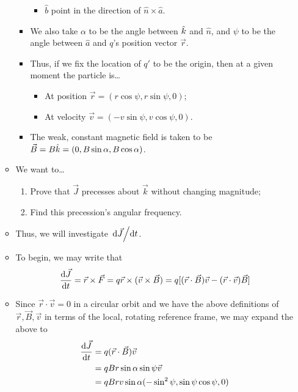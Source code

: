 \documentclass[../notes.tex]{subfiles}
\begin{document}
\begin{itemize}
\begin{itemize}
\begin{itemize}
\begin{itemize}
                \item $\hat{b}$ point in the direction of $\hat{n}\times\hat{a}$.
            \end{itemize}
            \item We also take $\alpha$ to be the angle between $\hat{k}$ and $\hat{n}$, and $\psi$ to be the angle between $\hat{a}$ and $q$'s position vector $\vec{r}$.
            \item Thus, if we fix the location of $q'$ to be the origin, then at a given moment the particle is\dots
            \begin{itemize}
                \item At position $\vec{r}=(r\cos\psi,r\sin\psi,0)$;
                \item At velocity $\vec{v}=(-v\sin\psi,v\cos\psi,0)$.
            \end{itemize}
            \item The weak, constant magnetic field is taken to be $\vec{B}=B\hat{k}=(0,B\sin\alpha,B\cos\alpha)$.
        \end{itemize}
        \item We want to\dots
        \begin{enumerate}
            \item Prove that $\vec{J}$ precesses about $\vec{k}$ without changing magnitude;
            \item Find this precession's angular frequency.
        \end{enumerate}
        \item Thus, we will investigate $\dv*{\vec{J}}{t}$.
        \item To begin, we may write that
        \begin{equation*}
            \dv{\vec{J}}{t} = \vec{r}\times\vec{F}
            = q\vec{r}\times(\vec{v}\times\vec{B})
            = q[(\vec{r}\cdot\vec{B})\vec{v}-(\vec{r}\cdot\vec{v})\vec{B}]
        \end{equation*}
        \item Since $\vec{r}\cdot\vec{v}=0$ in a circular orbit and we have the above definitions of $\vec{r},\vec{B},\vec{v}$ in terms of the local, rotating reference frame, we may expand the above to
        \begin{align*}
            \dv{\vec{J}}{t} &= q(\vec{r}\cdot\vec{B})\vec{v}\\
            &= qBr\sin\alpha\sin\psi\vec{v}\\
            &= qBrv\sin\alpha(-\sin^2\psi,\sin\psi\cos\psi,0)

\end{align*}
\end{itemize}
\end{itemize}
\end{document}
